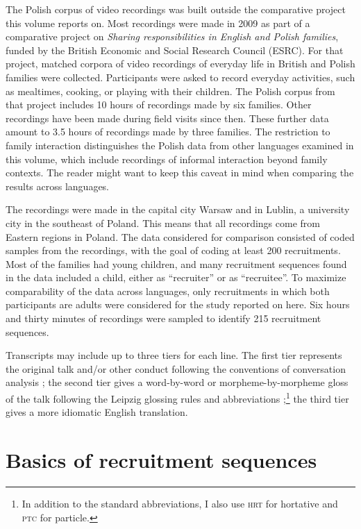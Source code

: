\documentclass[output=paper]{langsci/langscibook}
\begin{document}
The Polish corpus of video recordings was built outside the comparative project this volume reports on.  Most recordings were made in 2009 as part of a comparative project on \textit{Sharing responsibilities in English and Polish families}, funded by the British Economic and Social Research Council (ESRC).  For that project, matched corpora of video recordings of everyday life in British and Polish families were collected.  Participants were asked to record everyday activities, such as mealtimes, cooking, or playing with their children.  The Polish corpus from that project includes 10 hours of recordings made by six families.  Other recordings have been made during field visits since then.  These further data amount to 3.5 hours of recordings made by three families. The restriction to family interaction distinguishes the Polish data from other languages examined in this volume, which include recordings of informal interaction beyond family contexts. The reader might want to keep this caveat in mind when comparing the results across languages.

The recordings were made in the capital city Warsaw and in Lublin, a university city in the southeast of Poland.  This means that all recordings come from Eastern regions in Poland.  The data considered for comparison consisted of coded samples from the recordings, with the goal of coding at least 200 recruitments.  Most of the families had young children, and many recruitment sequences found in the data included a child, either as “recruiter” or as “recruitee”.  To maximize comparability of the data across languages, only recruitments in which both participants are adults were considered for the study reported on here.  Six hours and thirty minutes of recordings were sampled to identify 215 recruitment sequences.  

Transcripts may include up to three tiers for each line. The first tier represents the original talk and/or other conduct following the conventions of conversation analysis \citep{Jefferson2004}; the second tier gives a word-by-word or morpheme-by-morpheme gloss of the talk following the Leipzig glossing rules and abbreviations \citep{comrie_leipzig_2020};\footnote{In addition to the standard abbreviations, I also use \textsc{hrt} for hortative and \textsc{ptc} for particle.} the third tier gives a more idiomatic English translation. 

\section{Basics of recruitment sequences}
\end{document}
